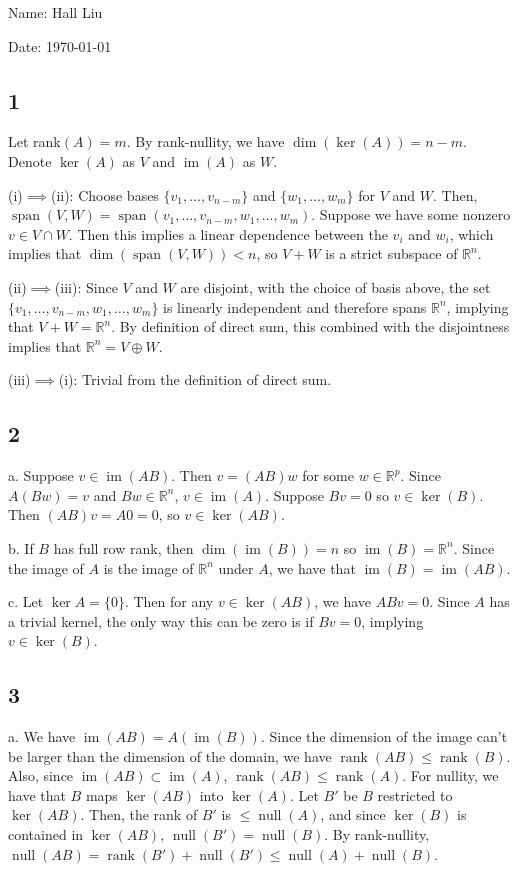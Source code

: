 \documentclass{article}
\DeclareMathOperator{\rank}{rank}
\DeclareMathOperator{\im}{im}
\DeclareMathOperator{\Span}{span}
\DeclareMathOperator{\Null}{null}
\newcommand{\rn}{\mathbb{R}}
\begin{document}
Name: Hall Liu

Date: \today 
\vspace{1.5cm}

\subsection*{1}
Let rank$(A)=m$. By rank-nullity, we have $\dim(\ker(A))=n-m$. Denote $\ker(A)$ as $V$ and $\im(A)$ as $W$.

\noindent (i)$\implies$(ii): Choose bases $\{v_1,\ldots,v_{n-m}\}$ and $\{w_1,\ldots,w_m\}$ for $V$ and $W$. Then, $\Span(V,W)=\Span(v_1,\ldots,v_{n-m},w_1,\ldots,w_m)$. Suppose we have some nonzero $v\in V\cap W$.
Then this implies a linear dependence between the $v_i$ and $w_i$, which implies that $\dim(\Span(V,W))<n$, so $V+W$ is a strict subspace of $\rn^n$.

\noindent (ii)$\implies$(iii): Since $V$ and $W$ are disjoint, with the choice of basis above, the set $\{v_1,\ldots,v_{n-m},w_1,\ldots,w_m\}$ is linearly independent and therefore spans $\rn^n$, implying that $V+W=\rn^n$. 
By definition of direct sum, this combined with the disjointness implies that $\rn^n=V\oplus W$.

\noindent (iii)$\implies$(i): Trivial from the definition of direct sum.

\subsection*{2}
a. Suppose $v\in\im(AB)$. Then $v=(AB)w$ for some $w\in\rn^p$. Since $A(Bw)=v$ and $Bw\in\rn^n$, $v\in\im(A)$. Suppose $Bv=0$ so $v\in\ker(B)$. Then $(AB)v=A0=0$, so $v\in\ker(AB)$.

\noindent b. If $B$ has full row rank, then $\dim(\im(B))=n$ so $\im(B)=\rn^n$. Since the image of $A$ is the image of $\rn^n$ under $A$, we have that $\im(B)=\im(AB)$.

\noindent c. Let $\ker A=\{0\}$. Then for any $v\in\ker(AB)$, we have $ABv=0$. Since $A$ has a trivial kernel, the only way this can be zero is if $Bv=0$, implying $v\in\ker(B)$.

\subsection*{3}
a. We have $\im(AB)=A(\im(B))$. Since the dimension of the image can't be larger than the dimension of the domain, we have $\rank(AB)\leq\rank(B)$. Also, since $\im(AB)\subset\im(A)$, $\rank(AB)\leq\rank(A)$.
For nullity, we have that $B$ maps $\ker(AB)$ into $\ker(A)$. Let $B'$ be $B$ restricted to $\ker(AB)$. Then, the rank of $B'$ is $\leq\Null(A)$, and since $\ker(B)$ is contained in $\ker(AB)$, $\Null(B')=\Null(B)$.
By rank-nullity, $\Null(AB)=\rank(B')+\Null(B')\leq\Null(A)+\Null(B)$.
\end{document}
